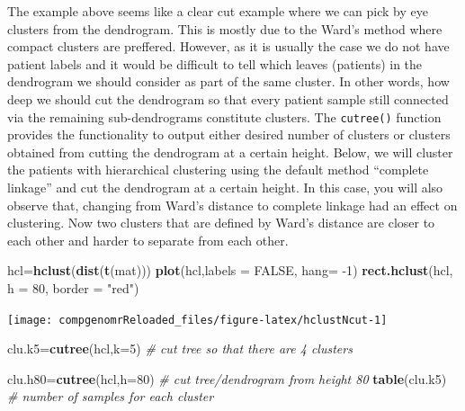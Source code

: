 \documentclass[12pt,]{krantz}
\newenvironment{Shaded}{\begin{snugshade}}{\end{snugshade}}
\newcommand{\CommentTok}[1]{\textcolor[rgb]{0.56,0.35,0.01}{\textit{#1}}}
\newcommand{\DataTypeTok}[1]{\textcolor[rgb]{0.13,0.29,0.53}{#1}}
\newcommand{\DecValTok}[1]{\textcolor[rgb]{0.00,0.00,0.81}{#1}}
\newcommand{\KeywordTok}[1]{\textcolor[rgb]{0.13,0.29,0.53}{\textbf{#1}}}
\newcommand{\NormalTok}[1]{#1}
\newcommand{\OtherTok}[1]{\textcolor[rgb]{0.56,0.35,0.01}{#1}}
\newcommand{\StringTok}[1]{\textcolor[rgb]{0.31,0.60,0.02}{#1}}
\begin{document}
The example above seems like a clear cut example where we can pick by eye clusters from the dendrogram. This is mostly due to the Ward's method where compact clusters are preffered. However, as it is usually the case we do not have patient labels and it would be difficult to tell which leaves (patients) in the dendrogram we should consider as part of the same cluster. In other words, how deep we should cut the dendrogram so that every patient sample still connected via the remaining sub-dendrograms constitute clusters. The \texttt{cutree()} function provides the functionality to output either desired number of clusters or clusters obtained from cutting the dendrogram at a certain height. Below, we will cluster the patients with hierarchical clustering using the default method ``complete linkage'' and cut the dendrogram at a certain height. In this case, you will also observe that, changing from Ward's distance to complete linkage had an effect on clustering. Now two clusters that are defined by Ward's distance are closer to each other and harder to separate from each other.

\begin{Shaded}
\begin{Highlighting}[]
\NormalTok{hcl=}\KeywordTok{hclust}\NormalTok{(}\KeywordTok{dist}\NormalTok{(}\KeywordTok{t}\NormalTok{(mat)))}
\KeywordTok{plot}\NormalTok{(hcl,}\DataTypeTok{labels =} \OtherTok{FALSE}\NormalTok{, }\DataTypeTok{hang=} \DecValTok{-1}\NormalTok{)}
\KeywordTok{rect.hclust}\NormalTok{(hcl, }\DataTypeTok{h =} \DecValTok{80}\NormalTok{, }\DataTypeTok{border =} \StringTok{"red"}\NormalTok{)}
\end{Highlighting}
\end{Shaded}

\begin{center}\texttt{[image: compgenomrReloaded\_files/figure-latex/hclustNcut-1]} \end{center}

\begin{Shaded}
\begin{Highlighting}[]
\NormalTok{clu.k5=}\KeywordTok{cutree}\NormalTok{(hcl,}\DataTypeTok{k=}\DecValTok{5}\NormalTok{) }\CommentTok{# cut tree so that there are 4 clusters}

\NormalTok{clu.h80=}\KeywordTok{cutree}\NormalTok{(hcl,}\DataTypeTok{h=}\DecValTok{80}\NormalTok{) }\CommentTok{# cut tree/dendrogram from height 80}
\KeywordTok{table}\NormalTok{(clu.k5) }\CommentTok{# number of samples for each cluster}
\end{Highlighting}
\end{Shaded}
\end{document}
